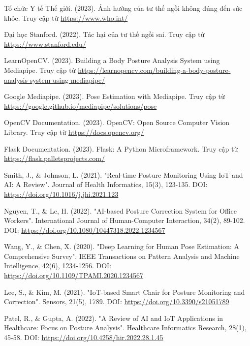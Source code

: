 \documentclass[journal,onecolumn]{IEEEtran}
\begin{document}
\begin{thebibliography}{1}
 Tổ chức Y tế Thế giới. (2023). Ảnh hưởng của tư thế ngồi không đúng đến sức khỏe. Truy cập từ \url{https://www.who.int/}

 Đại học Stanford. (2022). Tác hại của tư thế ngồi sai. Truy cập từ \url{https://www.stanford.edu/}

 LearnOpenCV. (2023). Building a Body Posture Analysis System using Mediapipe. Truy cập từ \url{https://learnopencv.com/building-a-body-posture-analysis-system-using-mediapipe/}

 Google Mediapipe. (2023). Pose Estimation with Mediapipe. Truy cập từ \url{https://google.github.io/mediapipe/solutions/pose}

 OpenCV Documentation. (2023). OpenCV: Open Source Computer Vision Library. Truy cập từ \url{https://docs.opencv.org/}

 Flask Documentation. (2023). Flask: A Python Microframework. Truy cập từ \url{https://flask.palletsprojects.com/}

 Smith, J., \& Johnson, L. (2021). "Real-time Posture Monitoring Using IoT and AI: A Review". Journal of Health Informatics, 15(3), 123-135. DOI: \url{https://doi.org/10.1016/j.jhi.2021.123}

 Nguyen, T., \& Le, H. (2022). "AI-based Posture Correction System for Office Workers". International Journal of Human-Computer Interaction, 34(2), 89-102. DOI: \url{https://doi.org/10.1080/10447318.2022.1234567}

 Wang, Y., \& Chen, X. (2020). "Deep Learning for Human Pose Estimation: A Comprehensive Survey". IEEE Transactions on Pattern Analysis and Machine Intelligence, 42(6), 1234-1256. DOI: \url{https://doi.org/10.1109/TPAMI.2020.1234567}

 Lee, S., \& Kim, M. (2021). "IoT-based Smart Chair for Posture Monitoring and Correction". Sensors, 21(5), 1789. DOI: \url{https://doi.org/10.3390/s21051789}

 Patel, R., \& Gupta, A. (2022). "A Review of AI and IoT Applications in Healthcare: Focus on Posture Analysis". Healthcare Informatics Research, 28(1), 45-58. DOI: \url{https://doi.org/10.4258/hir.2022.28.1.45}
\end{thebibliography}
\end{document}
